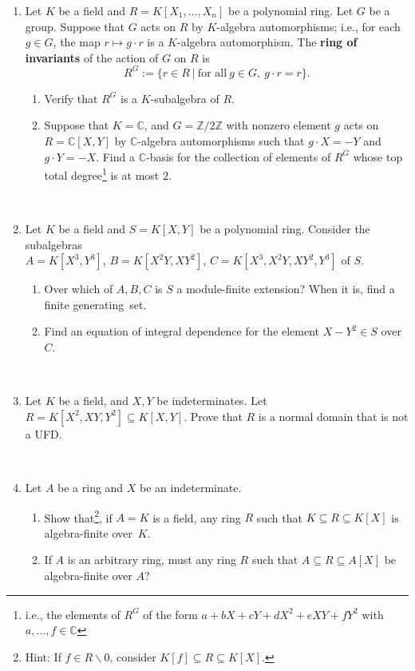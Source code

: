 \documentclass[12pt]{amsart}
\newcommand{\Z}{\mathbb{Z}}
\newcommand{\C}{\mathbb{C}}
\begin{document}
	
\begin{enumerate}

\item Let $K$ be a field and $R=K[X_1,\dots,X_n]$ be a polynomial ring. Let $G$ be a group. Suppose that $G$ acts on $R$ by $K$-algebra automorphisms; i.e., for each $g\in G$, the map $r\mapsto g\cdot r$ is a $K$-algebra automorphism. The \textbf{ring of invariants} of the action of $G$ on $R$ is 
\[ R^G := \{ r\in R \ | \ \text{for all} \ g\in G, \ g\cdot r=r\}.\]
\begin{enumerate}
\item Verify that $R^G$ is a $K$-subalgebra of $R$.
\item Suppose that $K=\C$, and $G=\Z/2\Z$ with nonzero element $g$ acts on $R=\C[X,Y]$ by $\C$-algebra automorphisms such that $g \cdot X= -Y$ and $g \cdot Y= -X$. Find a $\C$-basis for the collection of elements of $R^G$ whose top total degree\footnote{i.e., the elements of $R^G$ of the form $a+bX+cY+dX^2+eXY+fY^2$ with $a,\dots,f\in \C$} is at most $2$.
\end{enumerate}

\


\item Let $K$ be a field and $S=K[X,Y]$ be a polynomial ring. Consider the subalgebras\\ ${A=K[X^3,Y^3]}$, $B=K[X^2Y, XY^2]$, $C=K[X^3,X^2Y,XY^2,Y^3]$ of $S$.
\begin{enumerate}
\item Over which of $A,B,C$ is $S$ a module-finite extension? When it is, find a finite generating~set.
\item Find an equation of integral dependence for the element $X-Y^2\in S$ over $C$.
\end{enumerate}

\


\item Let $K$ be a field, and $X,Y$ be indeterminates. Let $R=K[X^2,XY,Y^2] \subseteq K[X,Y]$. Prove that $R$ is a normal domain that is not a UFD.

\


\item Let $A$ be a ring and $X$ be an indeterminate.  
\begin{enumerate}
\item Show that\footnote{Hint: If $f\in R\smallsetminus 0$, consider $K[f] \subseteq R \subseteq K[X]$.}, if $A=K$ is a field, any ring $R$ such that $K\subseteq R \subseteq K[X]$ is algebra-finite over~$K$.
\item If $A$ is an arbitrary ring, must any ring $R$ such that $A\subseteq R \subseteq A[X]$ be algebra-finite over $A$?
\end{enumerate}


\end{enumerate}
\end{document}
